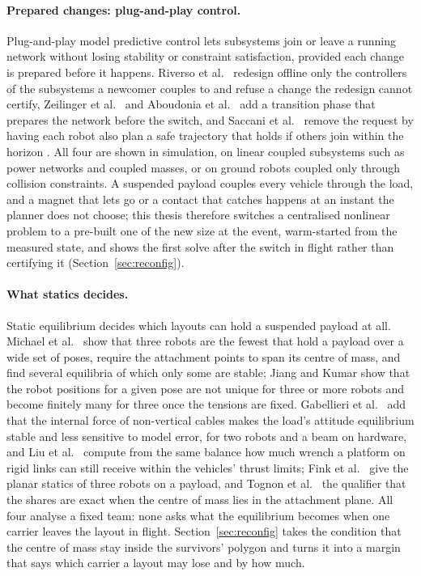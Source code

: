 \paragraph{Prepared changes: plug-and-play control.} Plug-and-play model predictive control lets subsystems join
or leave a running network without losing stability or constraint satisfaction, provided each change is
prepared before it happens. Riverso et al.\ \cite{riverso2013plug} redesign offline only the controllers of the
subsystems a newcomer couples to and refuse a change the redesign cannot certify, Zeilinger et al.\
\cite{zeilinger2013plug} and Aboudonia et al.\ \cite{aboudonia2022reconfigurable} add a transition phase that
prepares the network before the switch, and Saccani et al.\ \cite{saccani2023model} remove the request by having
each robot also plan a safe trajectory that holds if others join within the horizon \cite{farina2020hierarchical}. All four are shown in simulation, on linear coupled subsystems such as power
networks and coupled masses, or on ground robots coupled only through collision constraints. A suspended payload
couples every vehicle through the load, and a magnet that lets go or a contact that catches happens at an instant
the planner does not choose; this thesis therefore switches a centralised nonlinear problem to a pre-built one of
the new size at the event, warm-started from the measured state, and shows the first solve after the switch in
flight rather than certifying it (Section~\ref{sec:reconfig}).

\paragraph{What statics decides.} Static equilibrium decides which layouts can hold a suspended payload at all.
Michael et al.\ \cite{michael2011cooperative} show that three robots are the fewest that hold a payload over a
wide set of poses, require the attachment points to span its centre of mass, and find several equilibria of which
only some are stable; Jiang and Kumar \cite{jiang2013inverse} show that the robot positions for a given pose are
not unique for three or more robots and become finitely many for three once the tensions are fixed. Gabellieri et
al.\ \cite{gabellieri2023equilibria} add that the internal force of non-vertical cables makes the load's attitude
equilibrium stable and less sensitive to model error, for two robots and a beam on hardware, and Liu et al.\
\cite{liu2025wrench} compute from the same balance how much wrench a platform on rigid links can still receive
within the vehicles' thrust limits; Fink et al.\ \cite{fink2011planning} give the planar statics of three robots on a payload, and Tognon et al.\ \cite{tognon2018internal} the qualifier that the shares are exact when the centre of mass lies in the attachment plane. All four analyse a fixed team: none asks what the equilibrium becomes when one carrier leaves the
layout in flight. Section~\ref{sec:reconfig} takes the condition that the centre of mass stay inside the
survivors' polygon and turns it into a margin that says which carrier a layout may lose and by how much.

